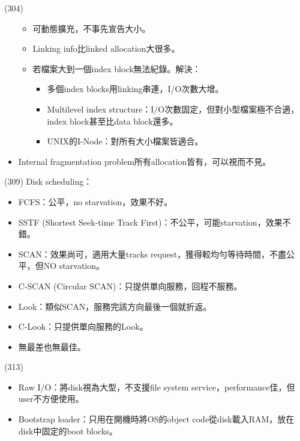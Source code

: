 \begin{theorem}{(304)}
\begin{itemize}
\begin{itemize}
            \item 可動態擴充，不事先宣告大小。
            \item Linking info比linked allocation大很多。
            \item 若檔案大到一個index block無法紀錄。解決：\begin{itemize}
                \item 多個index blocks用linking串連，I/O次數大增。
                \item Multilevel index structure：I/O次數固定，但對小型檔案極不合適，index block甚至比data block還多。
                \item UNIX的I-Node：對所有大小檔案皆適合。
            \end{itemize}
        \end{itemize}
        \item Internal fragmentation problem所有allocation皆有，可以視而不見。
    \end{itemize}
\end{theorem}

\begin{theorem}{(309)} Disk scheduling：\begin{itemize}
        \item FCFS：公平，no starvation，效果不好。
        \item SSTF (Shortest Seek-time Track First)：不公平，可能starvation，效果不錯。
        \item SCAN：效果尚可，適用大量tracks request，獲得較均勻等待時間，不盡公平，但NO starvation。
        \item C-SCAN (Circular SCAN)：只提供單向服務，回程不服務。
        \item Look：類似SCAN，服務完該方向最後一個就折返。
        \item C-Look：只提供單向服務的Look。
        \item 無最差也無最佳。
    \end{itemize}
\end{theorem}

\begin{theorem}{(313)} \quad\quad \begin{itemize}
        \item Raw I/O：將disk視為大型，不支援file system service，performance佳，但user不方便使用。
        \item Bootstrap loader：只用在開機時將OS的object code從disk載入RAM，放在disk中固定的boot blocks。
    \end{itemize}
\end{theorem}

